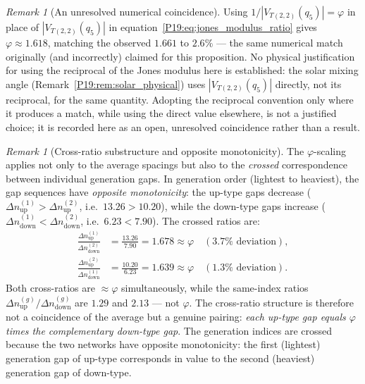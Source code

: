 \documentclass[11pt,a4paper]{article}
\theoremstyle{definition}\newtheorem{definition}[theorem]{Definition}
\theoremstyle{remark}
\newtheorem{remark}[theorem]{Remark}
\newcommand{\vp}{\varphi}
\newcommand{\Jones}{V}
\begin{document}
\begin{remark}[An unresolved numerical coincidence]
\label{P19:rem:jones_ratio_coincidence}
Using $1/|\Jones_{T(2,2)}(q_5)|=\vp$ in place of
$|\Jones_{T(2,2)}(q_5)|$ in equation~\eqref{P19:eq:jones_modulus_ratio}
gives $\vp\approx1.618$, matching the observed $1.661$ to $2.6\%$ ---
the same numerical match originally (and incorrectly) claimed for
this proposition. No physical justification for using the reciprocal
of the Jones modulus here is established: the solar mixing angle
(Remark~\ref{P19:rem:solar_physical}) uses $|\Jones_{T(2,2)}(q_5)|$
directly, not its reciprocal, for the same quantity. Adopting the
reciprocal convention only where it produces a match, while using the
direct value elsewhere, is not a justified choice; it is recorded
here as an open, unresolved coincidence rather than a result.
\end{remark}

\begin{remark}[Cross-ratio substructure and opposite monotonicity]
\label{P19:rem:cross_ratio}
The $\vp$-scaling applies not only to the average spacings but also
to the \emph{crossed} correspondence between individual generation
gaps.  In generation order (lightest to heaviest), the gap
sequences have \emph{opposite monotonicity}: the up-type gaps
decrease ($\Delta n_{\mathrm{up}}^{(1)}>\Delta n_{\mathrm{up}}^{(2)}$,
i.e.\ $13.26>10.20$), while the down-type gaps increase
($\Delta n_{\mathrm{down}}^{(1)}<\Delta n_{\mathrm{down}}^{(2)}$,
i.e.\ $6.23<7.90$).  The crossed ratios are:
\begin{align}
  \frac{\Delta n_{\mathrm{up}}^{(1)}}{\Delta n_{\mathrm{down}}^{(2)}}
  &= \frac{13.26}{7.90} = 1.678 \approx \vp
  \quad(\text{$3.7\%$ deviation}), \label{P19:eq:cross_ratio_a}\\
  \frac{\Delta n_{\mathrm{up}}^{(2)}}{\Delta n_{\mathrm{down}}^{(1)}}
  &= \frac{10.20}{6.23} = 1.639 \approx \vp
  \quad(\text{$1.3\%$ deviation}).
  \label{P19:eq:cross_ratios}
\end{align}
Both cross-ratios are $\approx\vp$ simultaneously, while the
same-index ratios $\Delta n_{\mathrm{up}}^{(g)}/\Delta
n_{\mathrm{down}}^{(g)}$ are $1.29$ and $2.13$ --- not $\vp$.
The cross-ratio structure is therefore not a coincidence of the
average but a genuine pairing: \emph{each up-type gap equals $\vp$
times the complementary down-type gap}.  The generation indices
are crossed because the two networks have opposite monotonicity:
the first (lightest) generation gap of up-type corresponds in value
to the second (heaviest) generation gap of down-type.
\end{remark}
\end{document}
